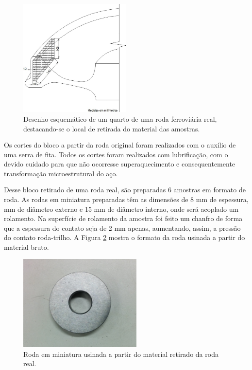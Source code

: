 \documentclass[
12pt,
openany, %
oneside, %
a4paper,			
english,			
brazil			        %
]{abntbibufjf}
\begin{document}
	\begin{figure}[H]
		\centering
		\includegraphics[width=0.5\textwidth]{secao_roda}
		\caption{Desenho esquemático de um quarto de uma roda ferroviária real, destacando-se o local de retirada do material das amostras. \cite{paula2016desgaste}}
		\label{fig:secao_roda}
	\end{figure}

	Os cortes do bloco a partir da roda original foram realizados com o auxílio de uma serra de fita. Todos os cortes foram realizados com lubrificação, com o devido cuidado para que não ocorresse superaquecimento e consequentemente transformação microestrutural do aço.

	Desse bloco retirado de uma roda real, são preparadas 6 amostras em formato de roda. As rodas em miniatura preparadas têm as dimensões de 8 mm de espessura,  mm de diâmetro externo e 15 mm de diâmetro interno, onde será acoplado um rolamento. Na superfície de rolamento da amostra foi feito um chanfro de forma que a espessura do contato seja de 2 mm apenas, aumentando, assim, a pressão do contato roda-trilho. A Figura \ref{fig:amostra_roda_pura} mostra o formato da roda usinada a partir do material bruto.
	
	\begin{figure}[H]
		\centering
		\includegraphics[width=0.55\textwidth]{amostra_roda_pura}
		\caption{Roda em miniatura usinada a partir do material retirado da roda real.}
		\label{fig:amostra_roda_pura}
	\end{figure}
	
\end{document}

